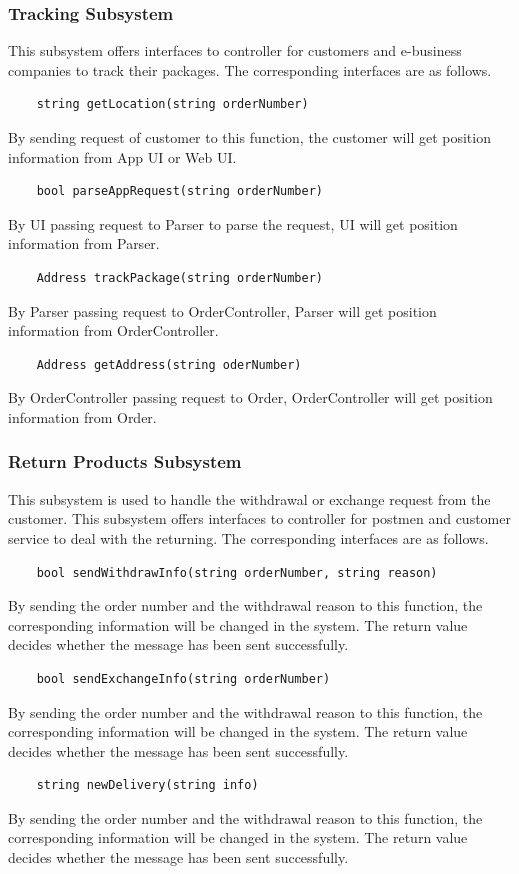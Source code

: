 \documentclass[12pt]{scrreprt}
\begin{document}
\subsubsection{Tracking Subsystem}
This subsystem offers interfaces to controller for customers and e-business companies to track  their packages. The corresponding interfaces are as follows.
\begin{lstlisting}
	string getLocation(string orderNumber)
\end{lstlisting}
By sending request of customer to this function, the customer will get position information from App UI or Web UI.
\begin{lstlisting}
	bool parseAppRequest(string orderNumber)
\end{lstlisting}
By UI passing request to Parser to parse the request, UI will get position information from Parser.
\begin{lstlisting}
	Address trackPackage(string orderNumber)
\end{lstlisting}
By Parser passing request to OrderController, Parser will get position information from OrderController.
\begin{lstlisting}
	Address getAddress(string oderNumber)
\end{lstlisting}
By OrderController passing request to Order, OrderController will get position information from Order.
\subsubsection{Return Products Subsystem}
This subsystem is used to handle the withdrawal or exchange request from the customer. This subsystem offers interfaces to controller for postmen and customer service to deal with the returning. The corresponding interfaces are as follows.
\begin{lstlisting}
	bool sendWithdrawInfo(string orderNumber, string reason)
\end{lstlisting}
By sending the order number and the	withdrawal reason to this function, the corresponding information will be	changed	in the system. The return value decides whether	the message has been sent successfully.
\begin{lstlisting}
	bool sendExchangeInfo(string orderNumber)
\end{lstlisting}
By sending the order number and the	withdrawal reason to this function, the corresponding information will be changed in the system. The return value decides whether the message has been sent successfully.
\begin{lstlisting}
	string newDelivery(string info)
\end{lstlisting}
By sending the order number and the	withdrawal reason to this function, the corresponding information will be	changed	in the system. The return value decides whether	the message has been sent successfully.
\end{document}

